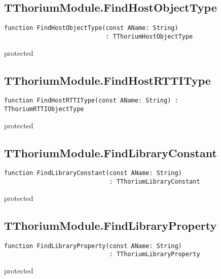 \subsection{TThoriumModule.FindHostObjectType}
\label{thoriumcorepkg:thorium:tthoriummodule:findhostobjecttype}
\begin{FPCList}
\Declaration 

\begin{verbatim}
function FindHostObjectType(const AName: String)
                            : TThoriumHostObjectType
\end{verbatim}
\Visibility
protected
\end{FPCList}
\subsection{TThoriumModule.FindHostRTTIType}
\label{thoriumcorepkg:thorium:tthoriummodule:findhostrttitype}
\begin{FPCList}
\Declaration 

\begin{verbatim}
function FindHostRTTIType(const AName: String) : TThoriumRTTIObjectType
\end{verbatim}
\Visibility
protected
\end{FPCList}
\subsection{TThoriumModule.FindLibraryConstant}
\label{thoriumcorepkg:thorium:tthoriummodule:findlibraryconstant}
\begin{FPCList}
\Declaration 

\begin{verbatim}
function FindLibraryConstant(const AName: String)
                             : TThoriumLibraryConstant
\end{verbatim}
\Visibility
protected
\end{FPCList}
\subsection{TThoriumModule.FindLibraryProperty}
\label{thoriumcorepkg:thorium:tthoriummodule:findlibraryproperty}
\begin{FPCList}
\Declaration 

\begin{verbatim}
function FindLibraryProperty(const AName: String)
                             : TThoriumLibraryProperty
\end{verbatim}
\Visibility
protected
\end{FPCList}
